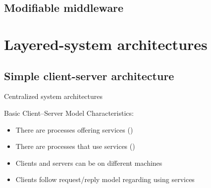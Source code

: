 \subsection{Modifiable middleware}
\section{Layered-system architectures}
\subsection{Simple client-server architecture}
\begin{slide}{Centralized system architectures}
  \begin{block}{Basic Client--Server Model}
    Characteristics:
    \begin{itemize}\tightlist
    \item There are processes offering services () 
    \item There are processes that use services ()
    \item Clients and servers can be on different machines
    \item Clients follow request/reply model regarding using services
    \end{itemize}
    \begin{center}
    \end{center}
  \end{block}
\end{slide}
